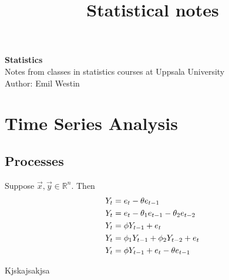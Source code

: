 \documentclass[11pt]{article}
\begin{document}
\title{Statistical notes}

\thispagestyle{empty}

\begin{center}
{\LARGE \bf Statistics}\\
Notes from classes in statistics courses at Uppsala University \\
Author: Emil Westin
\end{center}

\section{Time Series Analysis}
\subsection{Processes}

Suppose $\vec{x},\vec{y} \in \mathbb{R}^n$. Then 
\begin{align}
\index{1}
Y_t & = e_t - \theta e_{t-1} \label{MA1} \\

Y_t & = e_t - \theta_1 e_{t-1} -  \theta_2 e_{t-2} \label{MA2} \\
Y_t & = \phi Y_{t-1} + e_t \label{AR1} \\
Y_t & = \phi_1 Y_{t-1} + \phi_2 Y_{t-2} + e_t \label{AR2} \\
Y_t & = \phi Y_{t-1} + e_t - \theta e_{t-1} \label{ARMA} 
\end{align}

Kjskajsakjsa
\end{document}
